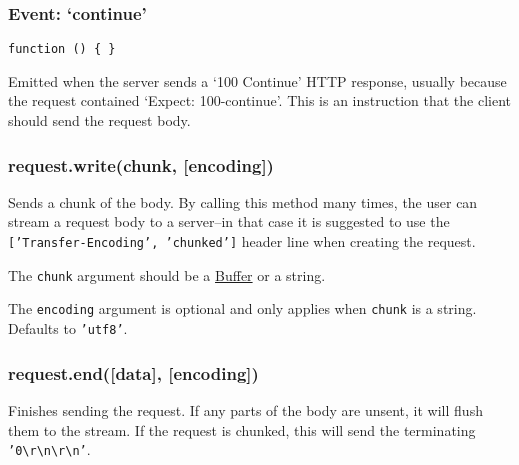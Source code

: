 \begin{Shaded}
\begin{Highlighting}[]
   
  \NormalTok{();}

  \NormalTok{(}\NormalTok{, }
    \NormalTok{(}\NormalTok{);}
    \NormalTok{();}
    \NormalTok{(}\NormalTok{);}
  \NormalTok{\});}
\NormalTok{\});}
\end{Highlighting}
\end{Shaded}

\subsubsection{Event: `continue'}

\texttt{function () \{ \}}

Emitted when the server sends a `100 Continue' HTTP response, usually
because the request contained `Expect: 100-continue'. This is an
instruction that the client should send the request body.

\subsubsection{request.write(chunk, {[}encoding{]})}

Sends a chunk of the body. By calling this method many times, the user
can stream a request body to a server--in that case it is suggested to
use the \texttt{{[}'Transfer-Encoding', 'chunked'{]}} header line when
creating the request.

The \texttt{chunk} argument should be a
\href{buffer.html\#buffer\_buffer}{Buffer} or a string.

The \texttt{encoding} argument is optional and only applies when
\texttt{chunk} is a string. Defaults to \texttt{'utf8'}.

\subsubsection{request.end({[}data{]}, {[}encoding{]})}

Finishes sending the request. If any parts of the body are unsent, it
will flush them to the stream. If the request is chunked, this will send
the terminating
\texttt{'0\textbackslash{}r\textbackslash{}n\textbackslash{}r\textbackslash{}n'}.

